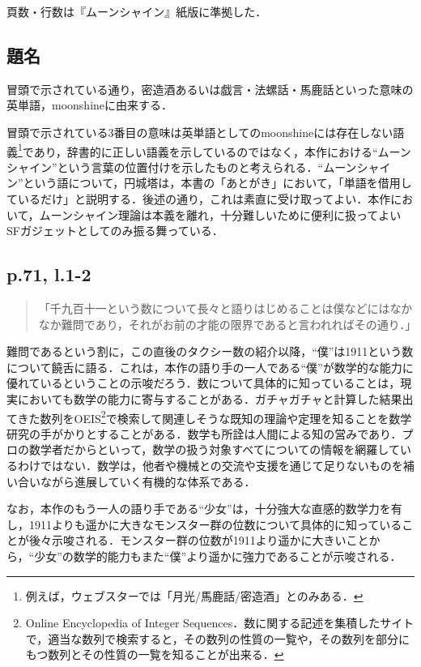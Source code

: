 \documentclass[10pt, a5paper, twoside]{jsarticle}
\theoremstyle{definition}
\begin{document}
		頁数・行数は『ムーンシャイン』紙版\cite{moonshine}に準拠した．

		\subsection{題名}

			冒頭で示されている通り，密造酒あるいは戯言・法螺話・馬鹿話といった意味の英単語，moonshineに由来する．

			冒頭で示されている3番目の意味は英単語としてのmoonshineには存在しない語義\footnote{例えば，ウェブスター\cite{webster}では「月光/馬鹿話/密造酒」とのみある．}であり，辞書的に正しい語義を示しているのではなく，本作における“ムーンシャイン”という言葉の位置付けを示したものと考えられる．“ムーンシャイン”という語について，円城塔は，本書の「あとがき」において，「単語を借用しているだけ」と説明する．後述の通り，これは素直に受け取ってよい．本作において，ムーンシャイン理論は本義を離れ，十分難しいために便利に扱ってよいSFガジェットとしてのみ振る舞っている．

		\subsection{p.71, l.1-2}

			\begin{quote}

				「千九百十一という数について長々と語りはじめることは僕などにはなかなか難問であり，それがお前の才能の限界であると言われればその通り．」

			\end{quote}

			難問であるという割に，この直後のタクシー数の紹介以降，“僕”は1911という数について饒舌に語る．これは，本作の語り手の一人である“僕”が数学的な能力に優れているということの示唆だろう．数について具体的に知っていることは，現実においても数学の能力に寄与することがある．ガチャガチャと計算した結果出てきた数列をOEIS\footnote{Online Encyclopedia of Integer Sequences\cite{oeis}．数に関する記述を集積したサイトで，適当な数列で検索すると，その数列の性質の一覧や，その数列を部分にもつ数列とその性質の一覧を知ることが出来る．}で検索して関連しそうな既知の理論や定理を知ることを数学研究の手がかりとすることがある\cite{ysn}．数学も所詮は人間による知の営みであり．プロの数学者だからといって，数学の扱う対象すべてについての情報を網羅しているわけではない．数学は，他者や機械との交流や支援を通じて足りないものを補い合いながら進展していく有機的な体系である．

			なお，本作のもう一人の語り手である“少女”は，十分強大な直感的数学力を有し，1911よりも遥かに大きなモンスター群の位数について具体的に知っていることが後々示唆される．モンスター群の位数が1911より遥かに大きいことから，“少女”の数学的能力もまた“僕”より遥かに強力であることが示唆される．
\end{document}
